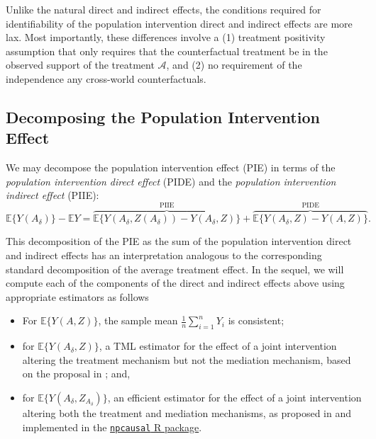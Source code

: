 \documentclass[12pt, krantz2,]{krantz}
\providecommand{\tightlist}{%
  \setlength{\itemsep}{0pt}\setlength{\parskip}{0pt}}
\theoremstyle{definition}
\theoremstyle{definition}
\theoremstyle{definition}
\newcommand{\1}{\mathbbm{1}}
\begin{document}
Unlike the natural direct and indirect effects, the conditions required for
identifiability of the population intervention direct and indirect effects are
more lax. Most importantly, these differences involve a (1) treatment positivity
assumption that only requires that the counterfactual treatment be in the
observed support of the treatment \(\mathcal{A}\), and (2) no requirement of the
independence any cross-world counterfactuals.

\hypertarget{decomposing-the-population-intervention-effect}{%
\subsection{Decomposing the Population Intervention Effect}\label{decomposing-the-population-intervention-effect}}

We may decompose the population intervention effect (PIE) in terms of the
\emph{population intervention direct effect} (PIDE) and the \emph{population
intervention indirect effect} (PIIE):
\begin{equation*}
  \mathbb{E}\{Y(A_\delta)\} - \mathbb{E}Y =
    \overbrace{\mathbb{E}\{Y(A_\delta, Z(A_\delta))
      - Y(A_\delta, Z)\}}^{\text{PIIE}} +
    \overbrace{\mathbb{E}\{Y(A_\delta, Z) - Y(A, Z)\}}^{\text{PIDE}}.
\end{equation*}

This decomposition of the PIE as the sum of the population intervention direct
and indirect effects has an interpretation analogous to the corresponding
standard decomposition of the average treatment effect. In the sequel, we will
compute each of the components of the direct and indirect effects above using
appropriate estimators as follows

\begin{itemize}
\tightlist
\item
  For \(\mathbb{E}\{Y(A, Z)\}\), the sample mean \(\frac{1}{n}\sum_{i=1}^n Y_i\) is
  consistent;
\item
  for \(\mathbb{E}\{Y(A_{\delta}, Z)\}\), a TML estimator for the effect of a
  joint intervention altering the treatment mechanism but not the mediation
  mechanism, based on the proposal in \citet{diaz2020causal}; and,
\item
  for \(\mathbb{E}\{Y(A_{\delta}, Z_{A_{\delta}})\}\), an efficient estimator for
  the effect of a joint intervention altering both the treatment and mediation
  mechanisms, as proposed in \citet{kennedy2017nonparametric} and implemented in the
  \href{https://github.com/ehkennedy/npcausal}{\texttt{npcausal} R package}.
\end{itemize}
\end{document}
